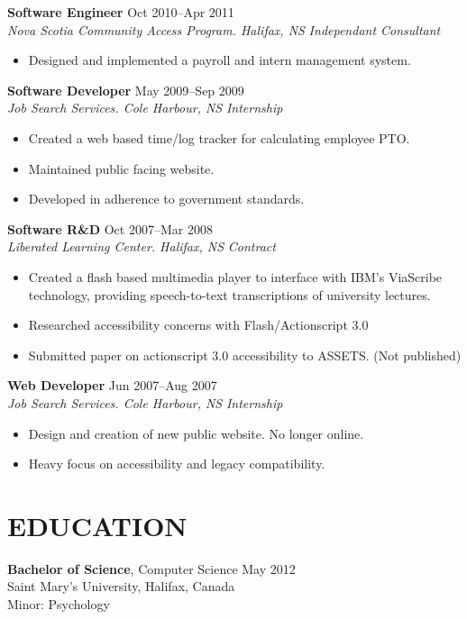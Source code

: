 \documentclass[line,margin]{res}
\begin{document}
\begin{resume}
\textbf{Software Engineer} \hfill Oct 2010--Apr 2011 \\
\textit{Nova Scotia Community Access Program. Halifax, NS} \hfill \textit{Independant Consultant}
\begin{itemize}  \itemsep-2pt
    \item Designed and implemented a payroll and intern management system.
\end{itemize} 

\textbf{Software Developer} \hfill May 2009--Sep 2009 \\
\textit{Job Search Services. Cole Harbour, NS} \hfill \textit{Internship}
\begin{itemize} \itemsep-2pt
    \item Created a web based time/log tracker for calculating employee PTO.
    \item Maintained public facing website.
    \item Developed in adherence to government standards.
\end{itemize}

\textbf{Software R\&D} \hfill Oct 2007--Mar 2008 \\
\textit{Liberated Learning Center. Halifax, NS} \hfill \textit{Contract}
\begin{itemize} \itemsep-2pt
    \item Created a flash based multimedia player to interface with IBM's ViaScribe technology, providing speech-to-text transcriptions of university lectures.
    \item Researched accessibility concerns with Flash/Actionscript 3.0
    \item Submitted paper on actionscript 3.0 accessibility to ASSETS. (Not published)
\end{itemize}

\textbf{Web Developer} \hfill Jun 2007--Aug 2007 \\
\textit{Job Search Services. Cole Harbour, NS} \hfill \textit{Internship}
\begin{itemize} \itemsep-2pt
    \item Design and creation of new public website. No longer online.
    \item Heavy focus on accessibility and legacy compatibility.
\end{itemize}

\section{EDUCATION}
\textbf{Bachelor of Science}, Computer Science \hfill May 2012 \\
Saint Mary's University, Halifax, Canada \\
Minor: Psychology


\end{resume}
\end{document}
